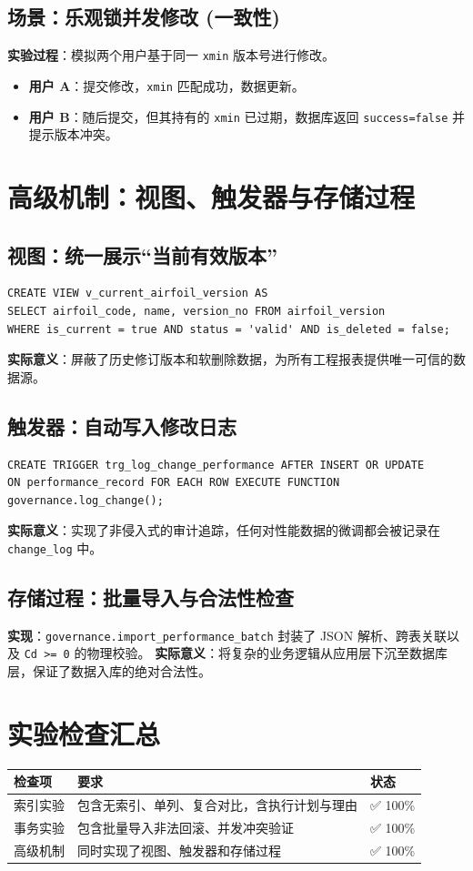 \documentclass[UTF8,a4paper,11pt]{ctexart}
\begin{document}
\subsection{场景：乐观锁并发修改 (一致性)}
\textbf{实验过程}：模拟两个用户基于同一 \texttt{xmin} 版本号进行修改。
\begin{itemize}
    \item \textbf{用户 A}：提交修改，\texttt{xmin} 匹配成功，数据更新。
    \item \textbf{用户 B}：随后提交，但其持有的 \texttt{xmin} 已过期，数据库返回 \texttt{success=false} 并提示版本冲突。
\end{itemize}

\section{高级机制：视图、触发器与存储过程}

\subsection{视图：统一展示“当前有效版本”}
\begin{lstlisting}
CREATE VIEW v_current_airfoil_version AS
SELECT airfoil_code, name, version_no FROM airfoil_version
WHERE is_current = true AND status = 'valid' AND is_deleted = false;
\end{lstlisting}
\textbf{实际意义}：屏蔽了历史修订版本和软删除数据，为所有工程报表提供唯一可信的数据源。

\subsection{触发器：自动写入修改日志}
\begin{lstlisting}
CREATE TRIGGER trg_log_change_performance AFTER INSERT OR UPDATE 
ON performance_record FOR EACH ROW EXECUTE FUNCTION governance.log_change();
\end{lstlisting}
\textbf{实际意义}：实现了非侵入式的审计追踪，任何对性能数据的微调都会被记录在 \texttt{change\_log} 中。

\subsection{存储过程：批量导入与合法性检查}
\textbf{实现}：\texttt{governance.import\_performance\_batch} 封装了 JSON 解析、跨表关联以及 \texttt{Cd >= 0} 的物理校验。
\textbf{实际意义}：将复杂的业务逻辑从应用层下沉至数据库层，保证了数据入库的绝对合法性。

\section{实验检查汇总}
\begin{longtable}{lll}
\toprule
检查项 & 要求 & 状态 \\
\midrule
索引实验 & 包含无索引、单列、复合对比，含执行计划与理由 & ✅ 100\% \\
事务实验 & 包含批量导入非法回滚、并发冲突验证 & ✅ 100\% \\
高级机制 & 同时实现了视图、触发器和存储过程 & ✅ 100\% \\
\bottomrule
\end{longtable}
\end{document}
